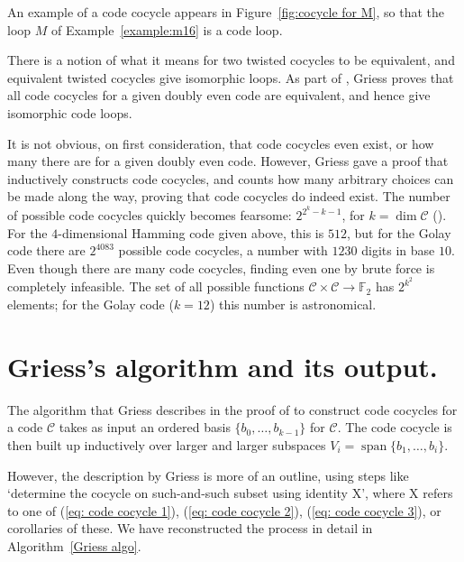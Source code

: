 \documentclass{article}
\theoremstyle{plain}
\theoremstyle{definition}
\def \cC {\mathcal{C}}
\def \FF {\mathbb{F}}
\DeclareMathOperator{\Span}{span}
\begin{document}
An example of a code cocycle appears in Figure~\ref{fig:cocycle for M}, so that the loop $M$ of Example~\ref{example:m16} is a code loop.

There is a notion of what it means for two twisted cocycles to be equivalent, and equivalent twisted cocycles give isomorphic loops.
As part of \cite[Theorem 10]{Griess}, Griess proves that all code cocycles for a given doubly even code are equivalent, and hence give isomorphic code loops. 

It is not obvious, on first consideration, that code cocycles even exist, or how many there are for a given doubly even code. 
However, Griess gave a proof that inductively constructs code cocycles, and counts how many arbitrary choices can be made along the way, proving that code cocycles do indeed exist.
The number of possible code cocycles quickly becomes fearsome: $2^{2^k-k-1}$, for $k=\dim \cC$ (\cite[Theorem 10]{Griess}).
For the $4$-dimensional Hamming code given above, this is $512$, but for the Golay code there are $2^{4083}$ possible code cocycles, a number with $1230$ digits in base $10$.
Even though there are many code cocycles, finding even one by brute force is completely infeasible.
The set of all possible functions $\cC\times \cC \to \FF_2$ has $2^{k^2}$ elements; for the Golay code ($k=12$) this number is astronomical.




\section{Griess's algorithm and its output.}

The algorithm that Griess describes in the proof of \cite[Theorem 10]{Griess} to construct code cocycles for a code $\cC$ takes as input an ordered  basis $\{b_0,\ldots,b_{k-1}\}$ for $\cC$. 
The code cocycle is then built up inductively over larger and larger subspaces $V_i = \Span\{b_1,\ldots,b_i\}$.%

However, the description by Griess is more of an outline, using steps like `determine the cocycle on such-and-such subset using identity X', where X refers to one of (\ref{eq: code cocycle 1}), (\ref{eq: code cocycle 2}), (\ref{eq: code cocycle 3}), or corollaries of these. We have reconstructed the process in detail in Algorithm~\ref{Griess algo}.

\end{document}
